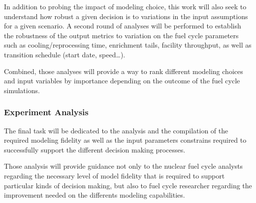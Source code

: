 In addition to probing the impact of modeling choice, this work will also seek
to understand how robust a given decision is to variations in the input
assumptions for a given scenario.  A second round of analyses will be performed
to establish the robustness of the output metrics to variation on the fuel cycle
parameters such as cooling/reprocessing time, enrichment tails, facility
throughput, as well as transition schedule (start date, speed\dots).

Combined, those analyses will provide a way to rank different modeling choices
and input variables by importance depending on the outcome of the fuel cycle
simulations.


\subsubsection{Experiment Analysis}

The final task will be dedicated to the analysis and the compilation of the
required modeling fidelity as well as the input parameters constrains required
to successfully support the different decision making processes.

Those analysis will provide guidance not only to the nuclear fuel cycle analysts
regarding the necessary level of model fidelity that is required to support
particular kinds of decision making, but also to fuel cycle researcher regarding
the improvement needed on the differents modeling capabilities.
